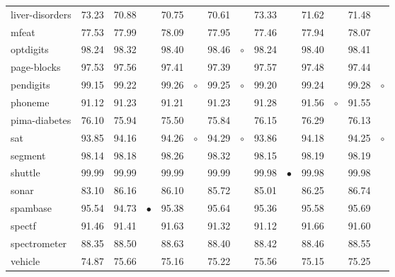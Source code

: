 \documentclass{article}
\begin{document}
\begin{table}[thb]
{\begin{tabular}{lrr@{\hspace{0.1cm}}cr@{\hspace{0.1cm}}cr@{\hspace{0.1cm}}cr@{\hspace{0.1cm}}cr@{\hspace{0.1cm}}cr@{\hspace{0.1cm}}c}
liver-disorders & 73.23 & 70.88 &           & 70.75 &           & 70.61 &          & 73.33 &           & 71.62 &          & 71.48 &         \\
mfeat & 77.53 & 77.99 &           & 78.09 &           & 77.95 &          & 77.46 &           & 77.94 &          & 78.07 &         \\
optdigits & 98.24 & 98.32 &           & 98.40 &           & 98.46 &  $\circ$ & 98.24 &           & 98.40 &          & 98.41 &         \\
page-blocks & 97.53 & 97.56 &           & 97.41 &           & 97.39 &          & 97.57 &           & 97.48 &          & 97.44 &         \\
pendigits & 99.15 & 99.22 &           & 99.26 &   $\circ$ & 99.25 &  $\circ$ & 99.20 &           & 99.24 &          & 99.28 &  $\circ$\\
phoneme & 91.12 & 91.23 &           & 91.21 &           & 91.23 &          & 91.28 &           & 91.56 &  $\circ$ & 91.55 &         \\
pima-diabetes & 76.10 & 75.94 &           & 75.50 &           & 75.84 &          & 76.15 &           & 76.29 &          & 76.13 &         \\
sat & 93.85 & 94.16 &           & 94.26 &   $\circ$ & 94.29 &  $\circ$ & 93.86 &           & 94.18 &          & 94.25 &  $\circ$\\
segment & 98.14 & 98.18 &           & 98.26 &           & 98.32 &          & 98.15 &           & 98.19 &          & 98.19 &         \\
shuttle & 99.99 & 99.99 &           & 99.99 &           & 99.99 &          & 99.98 & $\bullet$ & 99.98 &          & 99.98 &         \\
sonar & 83.10 & 86.16 &           & 86.10 &           & 85.72 &          & 85.01 &           & 86.25 &          & 86.74 &         \\
spambase & 95.54 & 94.73 & $\bullet$ & 95.38 &           & 95.64 &          & 95.36 &           & 95.58 &          & 95.69 &         \\
spectf & 91.46 & 91.41 &           & 91.63 &           & 91.32 &          & 91.12 &           & 91.66 &          & 91.60 &         \\
spectrometer & 88.35 & 88.50 &           & 88.63 &           & 88.40 &          & 88.42 &           & 88.46 &          & 88.55 &         \\
vehicle & 74.87 & 75.66 &           & 75.16 &           & 75.22 &          & 75.56 &           & 75.15 &          & 75.25 &         \\

\end{tabular}}
\end{table}
\end{document}
